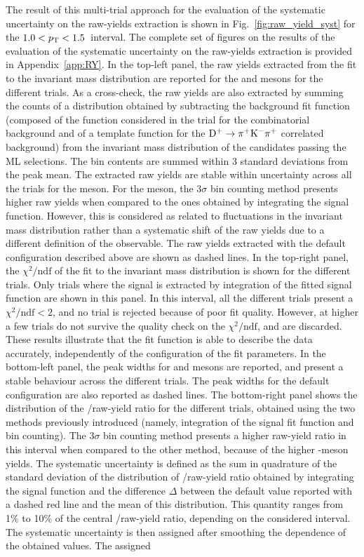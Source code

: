 The result of this multi-trial approach for the evaluation of the systematic uncertainty on the raw-yields extraction is shown in Fig.~\ref{fig:raw_yield_syst} for the $1.0<p_\mathrm{T}<1.5$~\gevc interval. The complete set of figures on the results of the evaluation of the systematic uncertainty on the raw-yields extraction is provided in Appendix~\ref{app:RY}. In the top-left panel, the raw yields extracted from the fit to the invariant mass distribution are reported for the \ds and \dpl mesons for the different trials. As a cross-check, the raw yields are also extracted by summing the counts of a distribution obtained by subtracting the background fit function (composed of the function considered in the trial for the combinatorial background and of a template function for the $\mathrm{D^+}\rightarrow\mathrm{\pi^+K^-\pi^+}$ correlated background) from the invariant mass distribution of the candidates passing the ML selections. The bin contents are summed within 3 standard deviations from the peak mean. The extracted raw yields are stable within uncertainty across all the trials for the \dpl meson. For the \ds meson, the $3\sigma$ bin counting method presents higher raw yields when compared to the ones obtained by integrating the signal function. However, this is considered as related to fluctuations in the invariant mass distribution rather than a systematic shift of the raw yields due to a different definition of the observable. The raw yields extracted with the default configuration described above are shown as dashed lines. In the top-right panel, the $\chi^2/\mathrm{ndf}$ of the fit to the invariant mass distribution is shown for the different trials. Only trials where the signal is extracted by integration of the fitted signal function are shown in this panel. In this \pt interval, all the different trials present a $\chi^2/\mathrm{ndf}<2$, and no trial is rejected because of poor fit quality. However, at higher \pt a few trials do not survive the quality check on the $\chi^2/\mathrm{ndf}$, and are discarded. These results illustrate that the fit function is able to describe the data accurately, independently of the configuration of the fit parameters. In the bottom-left panel, the peak widths for \ds and \dpl mesons are reported, and present a stable behaviour across the different trials. The peak widths for the default configuration are also reported as dashed lines. The bottom-right panel shows the distribution of the \ds/\dpl raw-yield ratio for the different trials, obtained using the two methods previously introduced (namely, integration of the signal fit function and bin counting). The $3\sigma$ bin counting method presents a higher raw-yield ratio in this \pt interval when compared to the other method, because of the higher \ds-meson yields. The systematic uncertainty is defined as the sum in quadrature of the standard deviation of the distribution of \ds/\dpl raw-yield ratio obtained by integrating the signal function and the difference $\Delta$ between the default value reported with a dashed red line and the mean of this distribution. This quantity ranges from 1\% to 10\% of the central \ds/\dpl raw-yield ratio, depending on the considered \pt interval. The systematic uncertainty is then assigned after smoothing the \pt dependence of the obtained values. The assigned 